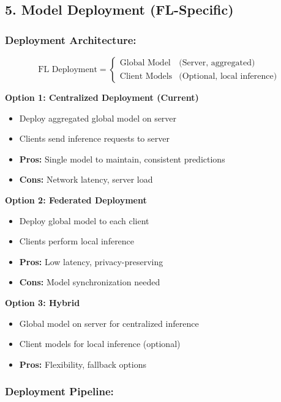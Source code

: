 \documentclass[12pt]{article}
\begin{document}
\subsection{5. Model Deployment (FL-Specific)}

\subsubsection{Deployment Architecture:}

\[
\text{FL Deployment} = \begin{cases}
\text{Global Model} & \text{(Server, aggregated)} \\
\text{Client Models} & \text{(Optional, local inference)}
\end{cases}
\]

\textbf{Option 1: Centralized Deployment (Current)}
\begin{itemize}
    \item Deploy aggregated global model on server
    \item Clients send inference requests to server
    \item \textbf{Pros:} Single model to maintain, consistent predictions
    \item \textbf{Cons:} Network latency, server load
\end{itemize}

\textbf{Option 2: Federated Deployment}
\begin{itemize}
    \item Deploy global model to each client
    \item Clients perform local inference
    \item \textbf{Pros:} Low latency, privacy-preserving
    \item \textbf{Cons:} Model synchronization needed
\end{itemize}

\textbf{Option 3: Hybrid}
\begin{itemize}
    \item Global model on server for centralized inference
    \item Client models for local inference (optional)
    \item \textbf{Pros:} Flexibility, fallback options
\end{itemize}

\subsubsection{Deployment Pipeline:}
\end{document}
